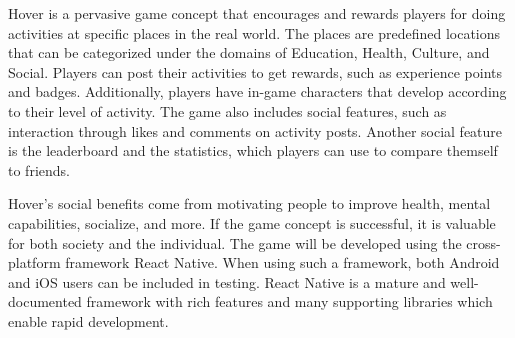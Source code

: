 \documentclass[../Main.tex]{subfiles}
\begin{document}
Hover is a pervasive game concept that encourages and rewards players for doing activities at specific places in the real world. The places are predefined locations that can be categorized under the domains of Education, Health, Culture, and Social. Players can post their activities to get rewards, such as experience points and badges. Additionally, players have in-game characters that develop according to their level of activity. The game also includes social features, such as interaction through likes and comments on activity posts. Another social feature is the leaderboard and the statistics, which players can use to compare themself to friends.

Hover’s social benefits come from motivating people to improve health, mental capabilities, socialize, and more. If the game concept is successful, it is valuable for both society and the individual. The game will be developed using the cross-platform framework React Native. When using such a framework, both Android and iOS users can be included in testing. React Native is a mature and well-documented framework with rich features and many supporting libraries which enable rapid development.



\biblio %
\end{document}
